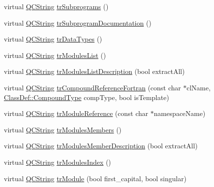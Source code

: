 \begin{DoxyCompactItemize}
\item 
virtual \mbox{\hyperlink{class_q_c_string}{Q\+C\+String}} \mbox{\hyperlink{class_translator_vietnamese_af124cb86e1c74879bb78188ed0deabb2}{tr\+Subprograms}} ()
\item 
virtual \mbox{\hyperlink{class_q_c_string}{Q\+C\+String}} \mbox{\hyperlink{class_translator_vietnamese_a2ef068d4f6f6f325d9785930bc769a08}{tr\+Subprogram\+Documentation}} ()
\item 
virtual \mbox{\hyperlink{class_q_c_string}{Q\+C\+String}} \mbox{\hyperlink{class_translator_vietnamese_a020eebcdccda4b0cb6abeb2f78e566b3}{tr\+Data\+Types}} ()
\item 
virtual \mbox{\hyperlink{class_q_c_string}{Q\+C\+String}} \mbox{\hyperlink{class_translator_vietnamese_a11b5352a6927a0b1541019781716aa9a}{tr\+Modules\+List}} ()
\item 
virtual \mbox{\hyperlink{class_q_c_string}{Q\+C\+String}} \mbox{\hyperlink{class_translator_vietnamese_a64188e5b65ea804930b57f9c9b3cfae8}{tr\+Modules\+List\+Description}} (bool extract\+All)
\item 
virtual \mbox{\hyperlink{class_q_c_string}{Q\+C\+String}} \mbox{\hyperlink{class_translator_vietnamese_aa78671b55bbf591176d56610ab544c8f}{tr\+Compound\+Reference\+Fortran}} (const char $\ast$cl\+Name, \mbox{\hyperlink{class_class_def_ae70cf86d35fe954a94c566fbcfc87939}{Class\+Def\+::\+Compound\+Type}} comp\+Type, bool is\+Template)
\item 
virtual \mbox{\hyperlink{class_q_c_string}{Q\+C\+String}} \mbox{\hyperlink{class_translator_vietnamese_ab73db393d407c86442a19e5aad6d1b5d}{tr\+Module\+Reference}} (const char $\ast$namespace\+Name)
\item 
virtual \mbox{\hyperlink{class_q_c_string}{Q\+C\+String}} \mbox{\hyperlink{class_translator_vietnamese_a15883ef8391aa4941410dacc48a802c8}{tr\+Modules\+Members}} ()
\item 
virtual \mbox{\hyperlink{class_q_c_string}{Q\+C\+String}} \mbox{\hyperlink{class_translator_vietnamese_af26a2aef7bd9e2d9b4b2a14c0868f1c7}{tr\+Modules\+Member\+Description}} (bool extract\+All)
\item 
virtual \mbox{\hyperlink{class_q_c_string}{Q\+C\+String}} \mbox{\hyperlink{class_translator_vietnamese_aa97dd18c74a89ce29ea480c28debb354}{tr\+Modules\+Index}} ()
\item 
virtual \mbox{\hyperlink{class_q_c_string}{Q\+C\+String}} \mbox{\hyperlink{class_translator_vietnamese_a82c2166b4643231f5915b48e7e6f8f85}{tr\+Module}} (bool first\+\_\+capital, bool singular)

\end{DoxyCompactItemize}
